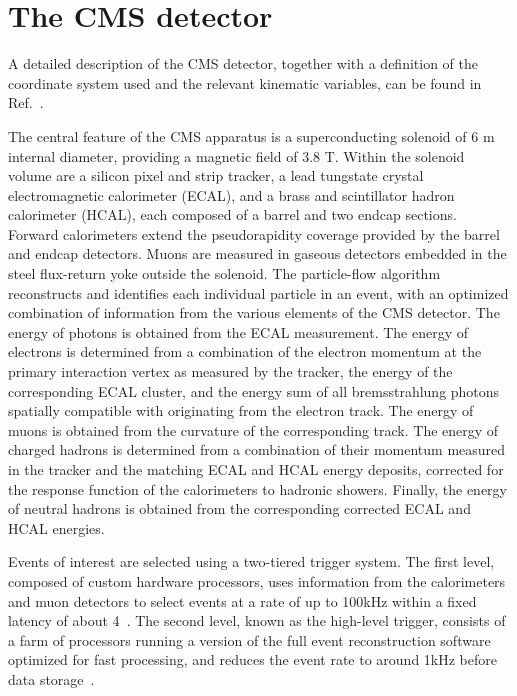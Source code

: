 \section{The CMS detector}\label{section:CMS_Detector}

A detailed description of the CMS detector, together with a definition of the coordinate system used and the relevant
kinematic variables, can be found in Ref.~\cite{Chatrchyan:2008zzk}.

The central feature of the CMS apparatus is a superconducting solenoid of 6 \unit{m} internal diameter, providing a
magnetic field of 3.8 \unit{T}. Within the solenoid volume are a silicon pixel and strip tracker, a lead tungstate
crystal electromagnetic calorimeter (ECAL), and a brass and scintillator hadron calorimeter (HCAL), each composed of a
barrel and two endcap sections. Forward calorimeters extend the pseudorapidity coverage provided by the barrel and
endcap detectors. Muons are measured in gaseous detectors embedded in the steel flux-return yoke outside the solenoid.
The particle-flow algorithm~\cite{CMS-PRF-14-001} reconstructs and identifies each individual particle in an event, with
an optimized combination of information from the various elements of the CMS detector.  The energy of photons is
obtained from the ECAL measurement.  The energy of electrons is determined from a combination of the electron momentum
at the primary interaction vertex as measured by the tracker, the energy of the corresponding ECAL cluster, and the
energy sum of all bremsstrahlung photons spatially compatible with originating from the electron track.  The energy of
muons is obtained from the curvature of the corresponding track.  The energy of charged hadrons is determined from a
combination of their momentum measured in the tracker and the matching ECAL and HCAL energy deposits, corrected for the
response function of the calorimeters to hadronic showers.  Finally, the energy of neutral hadrons is obtained from the
corresponding corrected ECAL and HCAL energies.

Events of interest are selected using a two-tiered trigger system.  The first level, composed of custom hardware
processors, uses information from the calorimeters and muon detectors to select events at a rate of up to 100\unit{kHz}
within a fixed latency of about 4\mus~\cite{Sirunyan:2020zal}.  The second level, known as the high-level trigger,
consists of a farm of processors running a version of the full event reconstruction software optimized for fast
processing, and reduces the event rate to around 1\unit{kHz} before data storage~\cite{Khachatryan:2016bia}.


